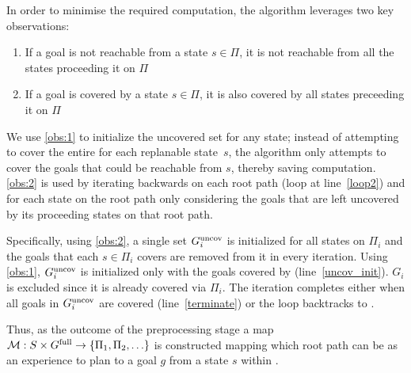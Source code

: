 \documentclass[conference]{IEEEtran}
\begin{document}
In order to minimise the required computation, the algorithm leverages two key observations:

\begin{enumerate}[label={\textbf{O\arabic*}},leftmargin=0.75cm]
	\item \label{obs:1}
	If a goal is not reachable from a state $s \in \Pi$, it is not reachable from all the states proceeding it on $\Pi$
	\item \label{obs:2}
	If a goal is covered by a state $s \in \Pi$, it is also covered by all states preceeding it on $\Pi$
\end{enumerate}

We use \ref{obs:1} to initialize the uncovered set for any state; instead of attempting to cover the entire \Gfull for each replanable state~$s$, the algorithm only attempts to cover the goals that could be reachable from $s$, thereby saving computation.
%
\ref{obs:2} is used by iterating backwards on each root path (loop at line~\ref{loop2}) and for each state on the root path only considering the goals that are left uncovered by its proceeding states on that root path.

Specifically, using \ref{obs:2}, a single set $G^{\textrm{uncov}}_i$ is initialized for all states on $\Pi_i$ and the goals that each $s \in \Pi_i$ covers are removed from it in every iteration.  Using \ref{obs:1}, $G^{\textrm{uncov}}_i$ is initialized only with the goals covered by \Sstart (line~\ref{uncov_init}). $G_i$ is excluded since it is already covered via $\Pi_i$. The iteration completes either when all goals in $G^{\textrm{uncov}}_i$ are covered (line~\ref{terminate}) or the loop backtracks to \Sstart.

Thus, as the outcome of the preprocessing stage a map $\mathcal{M}: S \times G^{\textrm{full}} \rightarrow \{ \Pi_1, \Pi_2, \ldots \}$ is constructed mapping which root path can be as an experience to plan to a goal $g$ from a state $s$ within \Tbound.

%
%
\end{document}
